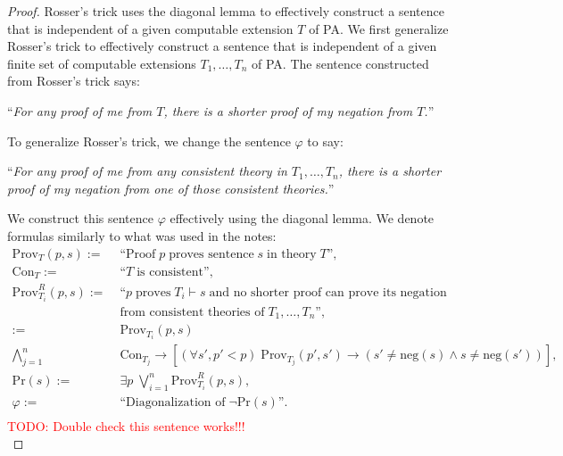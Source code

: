 \documentclass{article}
\newcommand{\TODO}[1]{\textcolor{red}{TODO: #1}}
\begin{document}
\begin{enumerate}[label={\bf Q\arabic*:}]
    \begin{proof}
      Rosser's trick uses the diagonal lemma to effectively construct a
      sentence that is independent of a given computable extension $T$ of
      PA. We first generalize Rosser's trick to effectively construct a
      sentence that is independent of a given finite set of computable
      extensions $T_1,\ldots,T_n$ of PA. The sentence constructed from
      Rosser's trick says:
      \begin{center}
        ``\textit{For any proof of me from $T$, there is a shorter proof of my
        negation from $T$.}''
      \end{center}

      To generalize Rosser's trick, we change the sentence $\varphi$ to
      say:
      \begin{center}
        ``\textit{For any proof of me from any consistent theory in
        $T_1,\ldots,T_n$, there is a shorter proof of my
        negation from one of those consistent theories.}''
      \end{center}

      We construct this sentence $\varphi$ effectively using the diagonal
      lemma. We denote formulas similarly to what was used in the notes:
      \begin{align*}
        \text{Prov}_T(p,s) :=&\;\text{``Proof}\; p\; \text{proves
          sentence}\; s\; \text{in theory}\; T\text{''},\\
        \text{Con}_T :=&\;\text{``}T\; \text{is consistent''},\\
        \text{Prov}_{T_i}^R(p,s) :=&\;\text{``}p\; \text{proves}\;
          T_i\vdash s\; \text{and no shorter proof can prove its
          negation}\\
          &\;\text{from consistent theories of}\; T_1,\ldots,T_n
          \text{''},\\ :=&\;\text{Prov}_{T_i}(p,s)\\
          \bigwedge_{j=1}^n&\; \text{Con}_{T_j} \rightarrow [(\forall
          s',p'<p)\; \text{Prov}_{T_j}(p',s') \rightarrow
          (s'\neq\text{neg}(s) \wedge s\neq\text{neg}(s'))], \\
        \text{Pr}(s) :=&\;\exists p\; \bigvee_{i=1}^n
          \text{Prov}_{T_i}^R(p,s),\\
        \varphi :=&\;\text{``Diagonalization of}\; \neg\text{Pr}(s)
          \text{''}.\\
      \end{align*}
      \TODO{Double check this sentence works!!!}\\


\end{proof}
\end{enumerate}
\end{document}
